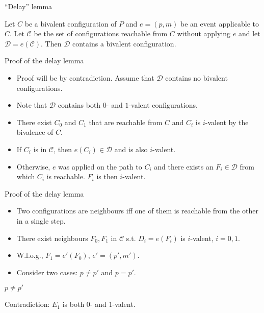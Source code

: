 \documentclass{beamer}
\begin{document}
\begin{frame}{``Delay'' lemma}
  \begin{lemma}
    Let $C$ be a bivalent configuration of $P$ and $e=(p,m)$ be an event applicable to $C$. Let $\mathcal{C}$ be the set of configurations reachable from $C$ without applying $e$ and let $\mathcal{D} = e(\mathcal{C})$. Then $\mathcal{D}$ contains a bivalent configuration.
  \end{lemma}
\end{frame}

\begin{frame}{Proof of the delay lemma}
  \begin{itemize}
    \item Proof will be by contradiction. Assume that $\mathcal{D}$ contains no bivalent configurations.
    \item Note that $\mathcal{D}$ contains both $0$- and $1$-valent configurations.
    \item There exist $C_0$ and $C_1$ that are reachable from $C$ and $C_i$ is $i$-valent by the bivalence of $C$.
    \item If $C_i$ is in $\mathcal{C}$, then $e(C_i) \in \mathcal{D}$ and is also $i$-valent.
    \item Otherwise, $e$ was applied on the path to $C_i$ and there exists an $F_i \in \mathcal{D}$ from which $C_i$ is reachable. $F_i$ is then $i$-valent.
  \end{itemize}
\end{frame}

\begin{frame}{Proof of the delay lemma}
  \begin{itemize}
    \item Two configurations are \alert{neighbours} iff one of them is reachable from the other in a single step.
    \item There exist neighbours $F_0, F_1$ in $\mathcal{C}$ s.t. $D_i = e(F_i)$ is $i$-valent, $i = 0,1$.
    \item W.l.o.g., $F_1 = e'(F_0)$, $e' = (p', m')$.
    \item Consider two cases: $p \ne p'$ and $p = p'$.
  \end{itemize}
\end{frame}

\begin{frame}{$p \ne p'$}
  \begin{figure}[!h]
  \centering
  \end{figure}
Contradiction: $E_1$ is both $0$- and $1$-valent.
\end{frame}
\end{document}
